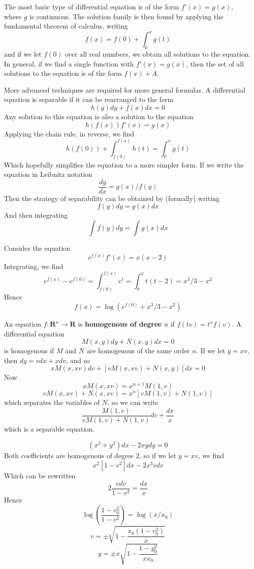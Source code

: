 The most basic type of differential equation is of the form $f'(x) = g(x)$, where $g$ is continuous. The solution family is then found by applying the fundamental theorem of calculus, writing
%
\[ f(x) = f(0) + \int_0^x g(t) \]
%
and if we let $f(0)$ over all real numbers, we obtain all solutions to the equation. In general, if we find a single function with $f'(x) = g(x)$, then the set of all solutions to the equation is of the form $f(x) + A$.

More advanced techniques are required for more general formulas. A differential equation is separable if it can be rearranged to the form
%
\[ h(y) dy + f(x) dx = 0 \]
%
Any solution to this equation is also a solution to the equation
%
\[ h(f(x)) f'(x) = g(x) \]
%
Applying the chain rule, in reverse, we find
%
\[ h(f(0)) + \int_{f(0)}^{f(x)} h(t) = \int_0^x g(t) \]
%
Which hopefully simplifies the equation to a more simpler form. If we write the equation in Leibnitz notation
%
\[ \frac{dy}{dx} = g(x)/f(y) \]
%
Then the strategy of separability can be obtained by (formally) writing
%
\[ f(y) dy = g(x) dx \]
%
And then integrating
%
\[ \int f(y) dy = \int g(x) dx \]

\begin{example}
    Consider the equation
    \[ e^{f(x)} f'(x) = x (x-2) \]
    Integrating, we find
    \[ e^{f(x)} - e^{f(0)} = \int_{f(0)}^{f(x)} e^t = \int_0^x t(t-2) = x^3/3 - x^2 \]
    Hence
    \[ f(x) = \log(e^{f(0)} + x^3/3 - x^2) \]
\end{example}

An equation $f: \mathbf{R}^n \to \mathbf{R}$ is {\bf homogenous of degree $n$} if $f(tv) = t^n f(v)$. A differential equation
%
\[ M(x,y) dy + N(x,y) dx = 0 \]
%
is homogenous if $M$ and $N$ are homogenous of the same order $n$. If we let $y = xv$, then $dy = vdx + xdv$, and so
%
\[ x M(x,xv) dv + [v M(x,xv) + N(x,y)] dx = 0 \]
%
Now
%
\[ x M(x,xv) =  x^{n+1} M(1,v) \]
\[ v M(x,xv) + N(x,xv) = x^n[vM(1,v) + N(1,v)] \]
%
which separates the variables of $N$, so we can write
%
\[ \frac{M(1,v)}{vM(1,v) + N(1,v)} dv + \frac{dx}{x} \]
%
which is a separable equation.

\begin{example}
    \[ (x^2 + y^2) dx - 2xy dy = 0 \]
    Both coefficients are homogenous of degree 2, so if we let $y = xv$, we find
    \[ x^2[1 - v^2] dx - 2x^3v dv \]
    Which can be rewritten
    \[ 2 \frac{v dv}{1-v^2} = \frac{dx}{x} \]
    Hence
    \[ \log\left( \frac{1-v_0^2}{1 - v^2} \right) = \log(x/x_0) \]
    \[ v = \pm \sqrt{ 1 - \frac{x_0 (1 - v_0^2)}{x} } \]
    \[ y = \pm x \sqrt{ 1 - \frac{1 - y_0^2}{x x_0} } \]
\end{example}

